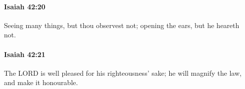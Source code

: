 		\paragraph{Isaiah 42:20} %
			\label{ISAIAH-42-20}

			Seeing many things, but thou observest not; opening the ears, but he heareth not.


		\paragraph{Isaiah 42:21} %
			\label{ISAIAH-42-21}

			The LORD is well pleased for his righteousness' sake; he will magnify the law, and make it honourable.


